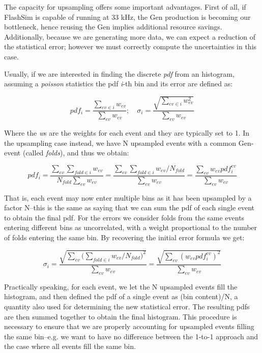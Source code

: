    The capacity for upsampling offers some important advantages. First of all, if FlashSim is capable of running at 33 kHz, the Gen production is becoming our bottleneck, hence reusing the Gen implies additional resource savings. Additionally, because we are generating more data, we can expect a reduction of the statistical error; however we must correctly compute the uncertainties in this case.
   
   Usually, if we are interested in finding the discrete \emph{pdf} from an histogram, assuming a \emph{poisson} statistics the pdf \emph{i}-th bin and its error are defined as:
   
   \[pdf_i = \frac{\sum_{ev \in i}{w_{ev}}}{\sum_{ev}{w_{ev}}}; \quad 
        \sigma_i = \frac{\sqrt{\sum_{ev \in i}{w_{ev}^2}}}{\sum_{ev}{w_{ev}}}\]
    
    Where the \emph{w}s are the weights for each event and they are typically set to 1.
   In the upsampling case instead, we have N upsampled events with a common Gen-event (called \emph{folds}), and thus we obtain:
   
      \[pdf_i = \frac{\sum_{ev}\sum_{fold\in i}{w_{ev}}}{N_{fold}\sum_{ev}{w_{ev}}} = \frac{\sum_{ev}\sum_{fold\in i}{w_{ev}/N_{fold}}}{\sum_{ev}{w_{ev}}} =
      \frac{\sum_{ev}{w_{ev}pdf_i^{ev}}}{\sum_{ev}{w_{ev}}}\]
      
    That is, each event may now enter multiple bins as it has been upsampled by a factor N--this is the same as saying that we can sum the pdf of each single event to obtain the final pdf. For the errors we consider folds from the same events entering different bins as uncorrelated, with a weight proportional to the number of folds entering the same bin. By recovering the initial error formula we get:
    
    \[\sigma_i = \frac{\sqrt{\sum_{ev}(\sum_{fold\in i}{w_{ev}/N_{fold})^2}}}{\sum_{ev}{w_{ev}}} =
      \frac{\sqrt{\sum_{ev}{(w_{ev}pdf_i^{ev})^2}}}{\sum_{ev}{w_{ev}}}\]
   
   Practically speaking, for each event, we let the N upsampled events fill the histogram, and then defined the pdf of a single event as (bin content)/N, a quantity also used for determining the new statistical error. The resulting pdfs are then summed together to obtain the final histogram. This procedure is necessary to ensure that we are properly accounting for upsampled events filling the same bin--e.g. we want to have no difference between the 1-to-1 approach and the case where all events fill the same bin.
   

